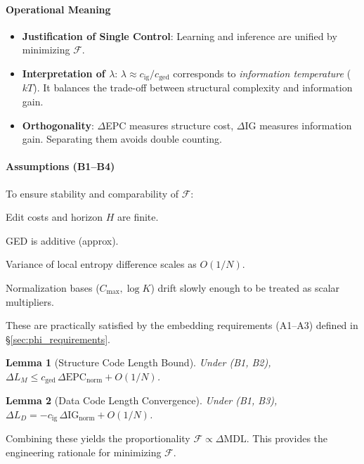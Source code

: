 \documentclass[12pt]{article}
\newtheorem{lemma}{Lemma}[section]
\newcommand{\F}{\mathcal{F}}
\newcommand{\gednorm}{\Delta\mathrm{EPC}_{\mathrm{norm}}}
\newcommand{\ignorm}{\Delta\mathrm{IG}_{\mathrm{norm}}}
\begin{document}
\paragraph{Operational Meaning}
\begin{itemize}[leftmargin=*]
    \item \textbf{Justification of Single Control}: Learning and inference are unified by minimizing $\F$.
    \item \textbf{Interpretation of $\lambda$}: $\lambda \approx c_{\mathrm{ig}}/c_{\mathrm{ged}}$ corresponds to \emph{information temperature} ($kT$). It balances the trade-off between structural complexity and information gain.
    \item \textbf{Orthogonality}: $\Delta$EPC measures structure cost, $\Delta$IG measures information gain. Separating them avoids double counting.
\end{itemize}

\paragraph{Assumptions (B1--B4)}\;
To ensure stability and comparability of $\F$:
\begin{description}[leftmargin=1.8em]
    \item[(B1) Local Boundedness] Edit costs and horizon $H$ are finite.
    \item[(B2) Edit Decomposition] GED is additive (approx).
    \item[(B3) Entropy Estimation] Variance of local entropy difference scales as $O(1/N)$.
    \item[(B4) Normalization Stability] Normalization bases ($C_{\max}, \log K$) drift slowly enough to be treated as scalar multipliers.
\end{description}
These are practically satisfied by the embedding requirements (A1--A3) defined in \S\ref{sec:phi_requirements}.

\begin{lemma}[Structure Code Length Bound]
Under (B1, B2), $\Delta L_M \le c_{\mathrm{ged}}\,\gednorm + O(1/N)$.
\end{lemma}
\begin{lemma}[Data Code Length Convergence]
Under (B1, B3), $\Delta L_D = -c_{\mathrm{ig}}\,\ignorm + O(1/N)$.
\end{lemma}
Combining these yields the proportionality $\F \propto \Delta\mathrm{MDL}$. This provides the engineering rationale for minimizing $\F$.
\end{document}
